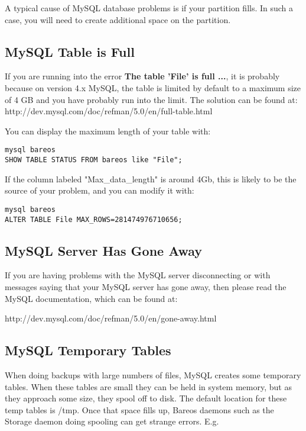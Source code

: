 A typical cause of MySQL database problems is if your partition fills. In
such a case, you will need to create additional space on the partition.


\subsection{MySQL Table is Full}

If you are running into the error {\bf The table 'File' is full ...},
it is probably because on version 4.x MySQL, the table is limited by
default to a maximum size of 4 GB and you have probably run into
the limit. The solution can be found at:
{http://dev.mysql.com/doc/refman/5.0/en/full-table.html}

You can display the maximum length of your table with:

\footnotesize
\begin{verbatim}
mysql bareos
SHOW TABLE STATUS FROM bareos like "File";
\end{verbatim}
\normalsize

If the column labeled "Max\_data\_length" is around 4Gb, this is likely
to be the source of your problem, and you can modify it with:

\footnotesize
\begin{verbatim}
mysql bareos
ALTER TABLE File MAX_ROWS=281474976710656;
\end{verbatim}
\normalsize


\subsection{MySQL Server Has Gone Away}
If you are having problems with the MySQL server disconnecting or with
messages saying that your MySQL server has gone away, then please read
the MySQL documentation, which can be found at:

{http://dev.mysql.com/doc/refman/5.0/en/gone-away.html}

\subsection{MySQL Temporary Tables}
When doing backups with large numbers of files, MySQL creates some
temporary tables.  When these tables are small they can be held in
system memory, but as they approach some size, they
spool off to disk.  The default location for these temp tables is
/tmp.  Once that space fills up, Bareos daemons such as the Storage
daemon doing spooling can get strange errors. E.g.

